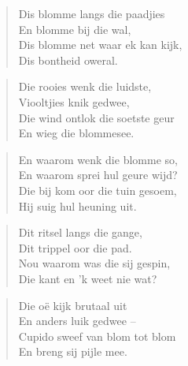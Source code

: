 \begin{verse}
Dis blomme langs die paadjies \\ 
En blomme bij die wal, \\ 
Dis blomme net waar ek kan kijk, \\ 
Dis bontheid oweral. \\ 
\end{verse}

\begin{verse}
Die rooies wenk die luidste, \\ 
Viooltjies knik gedwee, \\ 
Die wind ontlok die soetste geur \\ 
En wieg die blommesee. \\ 
\end{verse}

\begin{verse}
En waarom wenk die blomme so, \\ 
En waarom sprei hul geure wijd? \\ 
Die bij kom oor die tuin gesoem, \\ 
Hij suig hul heuning uit. \\ 
\end{verse}

\begin{verse}
Dit ritsel langs die gange, \\ 
Dit trippel oor die pad. \\ 
Nou waarom was die sij gespin, \\ 
Die kant en ’k weet nie wat? \\ 
\end{verse}

\begin{verse}
Die oë kijk brutaal uit \\ 
En anders luik gedwee -- \\ 
Cupido sweef van blom tot blom \\ 
En breng sij pijle mee. \\ 
\end{verse}